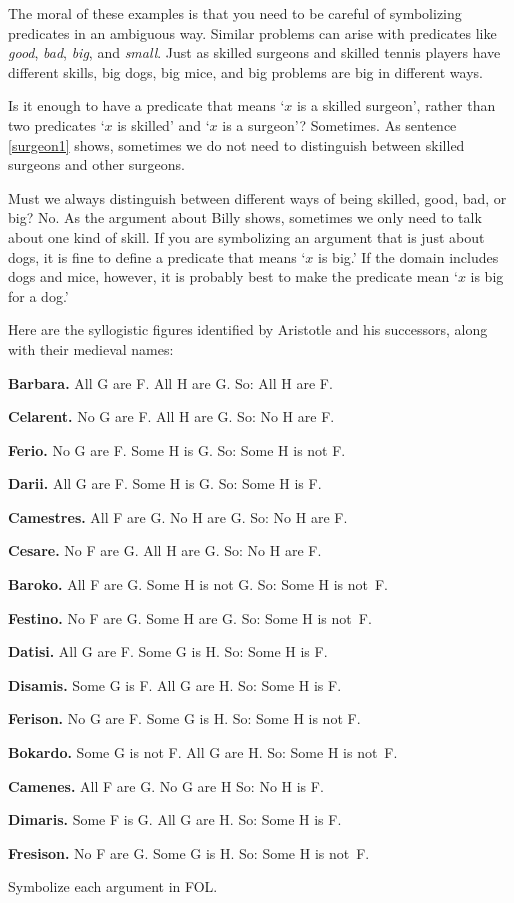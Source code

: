 The moral of these examples is that you need to be careful of symbolizing predicates in an ambiguous way. Similar problems can arise with predicates like \emph{good}, \emph{bad}, \emph{big}, and \emph{small}. Just as skilled surgeons and skilled tennis players have different skills, big dogs, big mice, and big problems are big in different ways.

Is it enough to have a predicate that means `$x$ is a skilled surgeon', rather than two predicates `$x$ is skilled' and `$x$ is a surgeon'? Sometimes. As sentence \ref{surgeon1} shows, sometimes we do not need to distinguish between skilled surgeons and other surgeons.

Must we always distinguish between different ways of being skilled, good, bad, or big? No. As the argument about Billy shows, sometimes we only need to talk about one kind of skill. If you are symbolizing an argument that is just about dogs, it is fine to define a predicate that means `$x$ is big.' If the domain includes dogs and mice, however, it is probably best to make the predicate mean `$x$ is big for a dog.'

\practiceproblems
\problempart
\label{pr.BarbaraEtc}
Here are the syllogistic figures identified by Aristotle and his successors, along with their medieval names:
\begin{earg}
	\item \textbf{Barbara.} All G are F. All H are G. So:  All H are F.
	\item \textbf{Celarent.} No G are F. All H are G. So: No H are F.
	\item \textbf{Ferio.} No G are F. Some H is G. So: Some H is not F.
	\item \textbf{Darii.} All G are F. Some H is G. So: Some H is F.
	\item \textbf{Camestres.} All F are G. No H are G. So: No H are F.
	\item \textbf{Cesare.} No F are G. All H are G. So: No H are F.
	\item \textbf{Baroko.} All F are G. Some H is not G. So: Some H is not~F.
	\item \textbf{Festino.} No F are G. Some H are G. So: Some H is not~F.
	\item \textbf{Datisi.} All G are F. Some G is H. So: Some H is F.
	\item \textbf{Disamis.} Some G is F. All G are H. So: Some H is F.
	\item \textbf{Ferison.} No G are F. Some G is H. So: Some H is not F.
	\item \textbf{Bokardo.} Some G is not F. All G are H. So:  Some H is not~F.
	\item \textbf{Camenes.} All F are G. No G are H So: No H is F.
	\item \textbf{Dimaris.} Some F is G. All G are H. So: Some H is F.
	\item \textbf{Fresison.} No F are G. Some G is H. So: Some H is not~F.
\end{earg}
Symbolize each argument in FOL.

